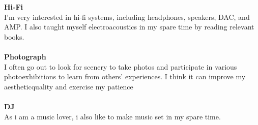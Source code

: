 \textbf{Hi-Fi}\\
I'm very interested in hi-fi systems, including headphones, speakers, DAC, and AMP. I also taught myself electroacoustics in my spare time by reading relevant books.\\
~\\
\textbf{Photograph}\\
I often go out to look for scenery to take photos and participate in various photoexhibitions to learn from others' experiences. I think it can improve my aestheticquality and exercise my patience\\
~\\
\textbf{DJ}\\
As i am a music lover, i also like to make music set in my spare time.\\


